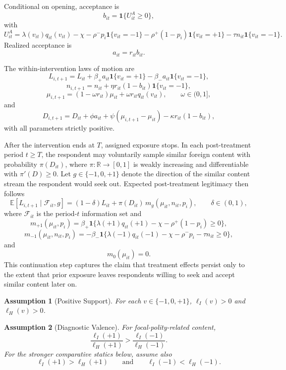 \documentclass[12pt,american]{article}
\newtheorem{assumption}{Assumption}
\begin{document}
\begin{refsection}
		Conditional on opening, acceptance is
		\[
		b_{it}=\mathbf{1}\{U_{it}^A\ge 0\},
		\]
		with
		\[
		U_{it}^{A}=\lambda(v_{it})q_{it}(v_{it})-\chi-\rho^{-}p_i\mathbf{1}\{v_{it}=-1\}-\rho^{+}(1-p_i)\mathbf{1}\{v_{it}=+1\}-\tau n_{it}\mathbf{1}\{v_{it}=-1\}.
		\]
		Realized acceptance is
		\[
		a_{it}=r_{it}b_{it}.
		\]
		
		The within-intervention laws of motion are
		\[
		L_{i,t+1}=L_{it}+\beta_{+}a_{it}\mathbf{1}\{v_{it}=+1\}-\beta_{-}a_{it}\mathbf{1}\{v_{it}=-1\},
		\]
		\[
		n_{i,t+1}=n_{it}+\eta r_{it}(1-b_{it})\mathbf{1}\{v_{it}=-1\},
		\]
		\[
		\mu_{i,t+1}=(1-\omega r_{it})\mu_{it}+\omega r_{it}q_{it}(v_{it}),
		\qquad \omega\in(0,1],
		\]
		and
		\[
		D_{i,t+1}=D_{it}+\phi a_{it}+\psi(\mu_{i,t+1}-\mu_{it})-\kappa r_{it}(1-b_{it}),
		\]
		with all parameters strictly positive.
		
		After the intervention ends at \(T\), assigned exposure stops. In each post-treatment period \(t\ge T\), the respondent may voluntarily sample similar foreign content with probability \(\pi(D_{it})\), where \(\pi:\mathbb{R}\to[0,1]\) is weakly increasing and differentiable with \(\pi'(D)\ge 0\). Let \(g\in\{-1,0,+1\}\) denote the direction of the similar content stream the respondent would seek out. Expected post-treatment legitimacy then follows
		\[
		\mathbb{E}[L_{i,t+1}\mid \mathcal F_{it},g]=(1-\delta)L_{it}+\pi(D_{it})\,m_g(\mu_{it},n_{it},p_i),
		\qquad \delta\in(0,1),
		\]
		where \(\mathcal F_{it}\) is the period-\(t\) information set and
		\[
		m_{+1}(\mu_{it},p_i)=\beta_+\mathbf{1}\{\lambda(+1)q_{it}(+1)-\chi-\rho^+(1-p_i)\ge 0\},
		\]
		\[
		m_{-1}(\mu_{it},n_{it},p_i)=-\beta_-\mathbf{1}\{\lambda(-1)q_{it}(-1)-\chi-\rho^-p_i-\tau n_{it}\ge 0\},
		\]
		and
		\[
		m_0(\mu_{it})=0.
		\]
		This continuation step captures the claim that treatment effects persist only to the extent that prior exposure leaves respondents willing to seek and accept similar content later on.
		
		\begin{assumption}[Positive Support]
			\label{ass:positive_support_revised}
			For each \(v\in\{-1,0,+1\}\), \(\ell_I(v)>0\) and \(\ell_H(v)>0\).
		\end{assumption}
		
		\begin{assumption}[Diagnostic Valence]
			\label{ass:diagnostic_valence_revised}
			For focal-polity-related content,
			\[
			\frac{\ell_I(+1)}{\ell_H(+1)}>\frac{\ell_I(-1)}{\ell_H(-1)}.
			\]
			For the stronger comparative statics below, assume also
			\[
			\ell_I(+1)>\ell_H(+1)
			\qquad\text{and}\qquad
			\ell_I(-1)<\ell_H(-1).
			\]
		\end{assumption}
		

\end{refsection}
\end{document}
